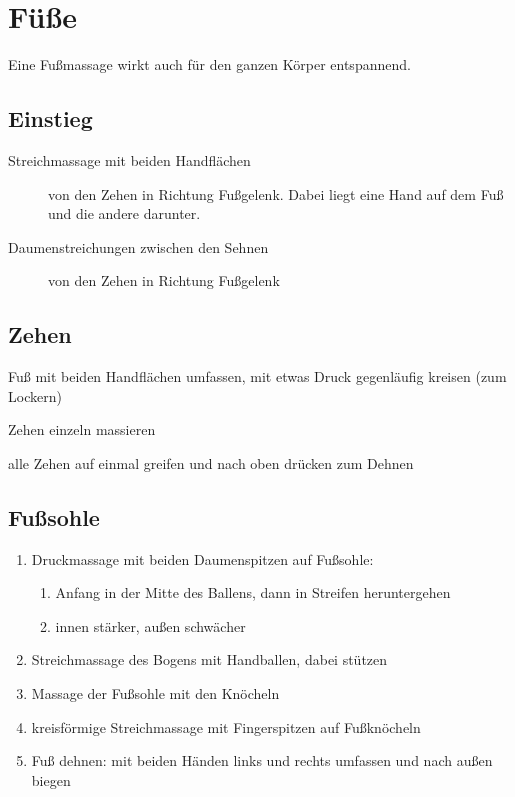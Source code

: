 \section{Füße}

Eine Fußmassage wirkt auch für den ganzen Körper entspannend.

\subsection{Einstieg}
\begin{description}
  \item[Streichmassage mit beiden Handflächen] von den Zehen in Richtung Fußgelenk. Dabei liegt eine Hand auf dem Fuß und die andere darunter.
  \item[Daumenstreichungen zwischen den Sehnen] von den Zehen in Richtung Fußgelenk
\end{description}

\subsection{Zehen}
\begin{description}
  \item Fuß mit beiden Handflächen umfassen, mit etwas Druck gegenläufig kreisen (zum Lockern)
  \item Zehen einzeln massieren
  \item alle Zehen auf einmal greifen und nach oben drücken zum Dehnen
\end{description}

\subsection{Fußsohle}
\begin{enumerate}
\item Druckmassage mit beiden Daumenspitzen auf Fußsohle:
	\begin{enumerate}
		\item Anfang in der Mitte des Ballens, dann in Streifen heruntergehen
		\item innen stärker, außen schwächer
	\end{enumerate}
\item Streichmassage des Bogens mit Handballen, dabei stützen
\item Massage der Fußsohle mit den Knöcheln
\item kreisförmige Streichmassage mit Fingerspitzen auf Fußknöcheln
\item Fuß dehnen: mit beiden Händen links und rechts umfassen und nach außen biegen
\end{enumerate}

